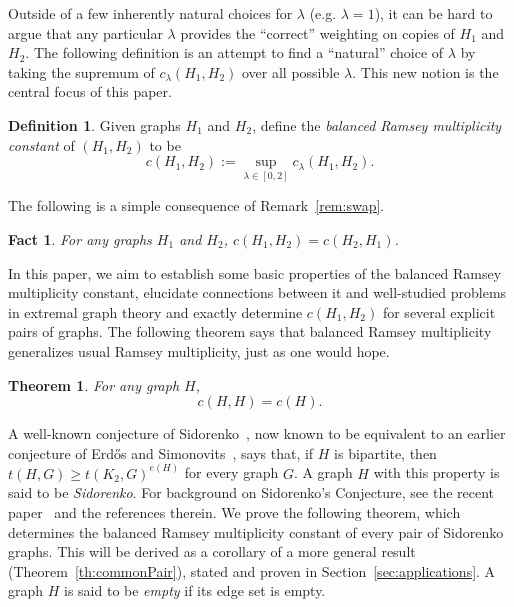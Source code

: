 \documentclass[12pt]{article}
\numberwithin{equation}{section}
\newtheorem{thm}[equation]{Theorem}
\newtheorem{fact}[equation]{Fact}
\theoremstyle{definition}
\newtheorem{defn}[equation]{Definition}
\theoremstyle{remark}
\begin{document}
Outside of a few inherently natural choices for $\lambda$ (e.g. $\lambda=1$), it can be hard to argue that any particular $\lambda$ provides the ``correct'' weighting on copies of $H_1$ and $H_2$. The following definition is an attempt to find a ``natural'' choice of $\lambda$ by taking the supremum of $c_\lambda(H_1,H_2)$ over all possible $\lambda$. This new notion is the central focus of this paper.

\begin{defn}
\label{defn:balancedRM}
Given graphs $H_1$ and $H_2$, define the \emph{balanced Ramsey multiplicity constant} of $(H_1,H_2)$ to be
\[c(H_1,H_2):=\sup_{\lambda\in[0,2]}c_\lambda(H_1,H_2).\]
\end{defn}

The following is a simple consequence of Remark~\ref{rem:swap}. 

\begin{fact}
\label{fact:ch1h2isch2h1}
For any graphs $H_1$ and $H_2$, $c(H_1, H_2) = c(H_2, H_1)$.
\end{fact}




In this paper, we aim to establish some basic properties of the balanced Ramsey multiplicity constant, elucidate connections between it and well-studied problems in extremal graph theory and exactly determine $c(H_1,H_2)$ for several explicit pairs of graphs. The following theorem says that balanced Ramsey multiplicity generalizes usual Ramsey multiplicity, just as one would hope.

\begin{thm}
\label{th:c(H,H)=c(H)}
For any graph $H$, 
\[c(H,H)=c(H).\] 
\end{thm}

A well-known conjecture of Sidorenko~\cite[Conjecture~1]{Sidorenko93}, now known to be equivalent to an earlier conjecture of Erd\H{o}s and Simonovits~\cite[Conjecture~2]{ErdosSimonovits84}, says that, if $H$ is bipartite, then $t(H,G)\geq t(K_2,G)^{e(H)}$ for every graph $G$. A graph $H$ with this property is said to be \emph{Sidorenko}. For background on Sidorenko's Conjecture, see the recent paper~\cite{ConlonLee21} and the references therein. We prove the following theorem, which determines the balanced Ramsey multiplicity constant of every pair of Sidorenko graphs. This will be derived as a corollary of a more general result (Theorem~\ref{th:commonPair}), stated and proven in Section~\ref{sec:applications}. A graph $H$ is said to be \emph{empty} if its edge set is empty.
\end{document}
